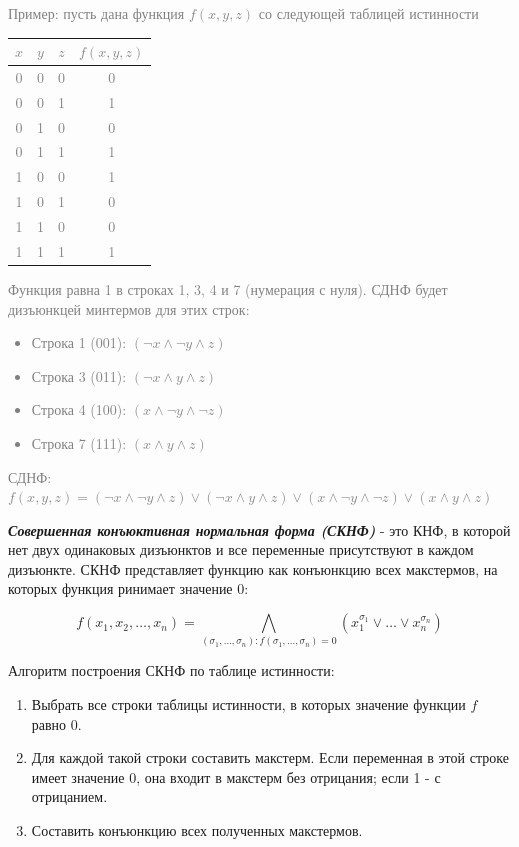 \documentclass[12pt,letterpaper]{article}
\begin{document}
\textcolor{gray}{Пример: пусть дана функция \(f(x, y, z)\) со следующей таблицей истинности}

\textcolor{gray}{\begin{center}
\begin{tabular}{|c|c|c|c|}
  \hline
  \(x\) & \(y\) & \(z\) & \(f(x, y, z)\) \\
  \hline
  0 & 0 & 0 & 0 \\
  \hline
  0 & 0 & 1 & 1 \\
  \hline
  0 & 1 & 0 & 0 \\
  \hline
  0 & 1 & 1 & 1 \\
  \hline
  1 & 0 & 0 & 1 \\
  \hline
  1 & 0 & 1 & 0 \\
  \hline
  1 & 1 & 0 & 0 \\
  \hline
  1 & 1 & 1 & 1 \\
  \hline
\end{tabular}
\end{center}}

\textcolor{gray}{Функция равна 1 в строках 1, 3, 4 и 7 (нумерация с нуля). СДНФ будет дизъюнкцей минтермов для этих строк:}

\textcolor{gray}{\begin{itemize}
  \item Строка 1 (001): \((\neg x \wedge \neg y \wedge z)\)
  \item Строка 3 (011): \((\neg x \wedge y \wedge z)\)
  \item Строка 4 (100): \((x \wedge \neg y \wedge \neg z)\)
  \item Строка 7 (111): \((x \wedge y \wedge z)\)
\end{itemize}}

\textcolor{gray}{СДНФ: \(f(x, y, z) = (\neg x \wedge \neg y \wedge z) \vee (\neg x \wedge y \wedge z) \vee (x \wedge \neg y \wedge \neg z) \vee (x \wedge y \wedge z)\)}

\textbf{\emph{Совершенная конъюктивная нормальная форма (СКНФ)}} - это КНФ, в которой нет двух одинаковых дизъюнктов и все переменные присутствуют в каждом дизъюнкте. СКНФ представляет функцию как конъюнкцию всех макстермов, на которых функция ринимает значение 0:

\[f(x_1, x_2, \ldots, x_n) = \bigwedge_{(\sigma_1, \ldots, \sigma_n):f(\sigma_1, \ldots, \sigma_n) = 0} (x_1 ^ {\sigma_1} \vee \ldots \vee x_n ^ {\sigma_n})\]

Алгоритм построения СКНФ по таблице истинности:

\begin{enumerate}
  \item Выбрать все строки таблицы истинности, в которых значение функции \(f\) равно 0.
  \item Для каждой такой строки составить макстерм. Если переменная в этой строке имеет значение 0, она входит в макстерм без отрицания; если 1 - с отрицанием.
  \item Составить конъюнкцию всех полученных макстермов.
\end{enumerate}
\end{document}
